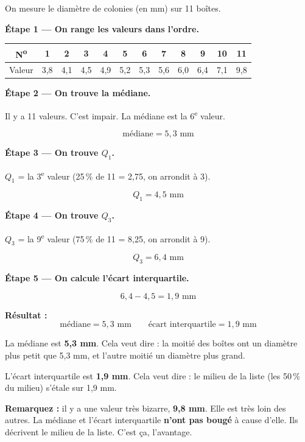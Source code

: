 \documentclass[12pt,a4paper]{article}
\begin{document}
\begin{exemple}
On mesure le diamètre de colonies (en mm) sur 11 boîtes.

\vspace{0.2cm}
\textbf{Étape 1 — On range les valeurs dans l'ordre.}

\begin{center}
\begin{tabular}{|c|c|c|c|c|c|c|c|c|c|c|c|}
\hline
N\textsuperscript{o} & 1 & 2 & 3 & 4 & 5 & 6 & 7 & 8 & 9 & 10 & 11 \\
\hline
Valeur & 3,8 & 4,1 & 4,5 & 4,9 & 5,2 & 5,3 & 5,6 & 6,0 & 6,4 & 7,1 & 9,8 \\
\hline
\end{tabular}
\end{center}

\vspace{0.3cm}
\textbf{Étape 2 — On trouve la médiane.}

Il y a 11 valeurs. C'est impair. La médiane est la 6\textsuperscript{e} valeur.

\[
\text{médiane} = 5{,}3 \text{ mm}
\]

\vspace{0.3cm}
\textbf{Étape 3 — On trouve $Q_1$.}

$Q_1$ = la 3\textsuperscript{e} valeur (25\,\% de 11 = 2,75, on arrondit à 3).

\[
Q_1 = 4{,}5 \text{ mm}
\]

\vspace{0.3cm}
\textbf{Étape 4 — On trouve $Q_3$.}

$Q_3$ = la 9\textsuperscript{e} valeur (75\,\% de 11 = 8,25, on arrondit à 9).

\[
Q_3 = 6{,}4 \text{ mm}
\]

\vspace{0.3cm}
\textbf{Étape 5 — On calcule l'écart interquartile.}

\[
6{,}4 - 4{,}5 = 1{,}9 \text{ mm}
\]

\vspace{0.3cm}
\textbf{Résultat :}
\[
\boxed{\text{médiane} = 5{,}3 \text{ mm} \qquad \text{écart interquartile} = 1{,}9 \text{ mm}}
\]
\end{exemple}

\begin{enclair}
La médiane est \textbf{5,3 mm}. Cela veut dire : la moitié des boîtes ont un diamètre plus petit que 5,3 mm, et l'autre moitié un diamètre plus grand.

\vspace{0.2cm}
L'écart interquartile est \textbf{1,9 mm}. Cela veut dire : le milieu de la liste (les 50\,\% du milieu) s'étale sur 1,9 mm.

\vspace{0.2cm}
\textbf{Remarquez :} il y a une valeur très bizarre, \textbf{9,8 mm}. Elle est très loin des autres. La médiane et l'écart interquartile \textbf{n'ont pas bougé} à cause d'elle. Ils décrivent le milieu de la liste. C'est ça, l'avantage.
\end{enclair}
\end{document}
